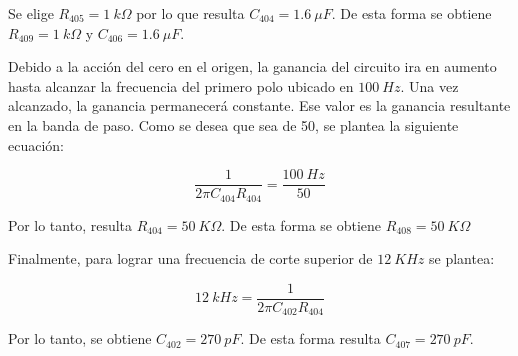 Se elige $R_{405}=1\:k\Omega$ por lo que resulta $C_{404}=1.6\:\mu F$. De esta forma se obtiene $R_{409}=1\:k\Omega$ y $C_{406}=1.6\:\mu F$.

Debido a la acción del cero en el origen, la ganancia del circuito ira en aumento hasta alcanzar la frecuencia del primero polo ubicado en $100\:Hz$. Una vez alcanzado, la ganancia permanecerá constante. Ese valor es la ganancia resultante en la banda de paso. Como se desea que sea de 50, se plantea la siguiente ecuación:

\begin{equation*} 
	\frac{1}{2\pi C_{404}R_{404}}=\frac{100\:Hz}{50}
\end{equation*}

Por lo tanto, resulta $R_{404}=50\:K\Omega$. De esta forma se obtiene $R_{408}=50\:K\Omega$

Finalmente, para lograr una frecuencia de corte superior de $12\:KHz$ se plantea:

\begin{equation*} 
	12\:kHz=\frac{1}{2\pi C_{402}R_{404}}
\end{equation*}

Por lo tanto, se obtiene $C_{402}=270\:pF$. De esta forma resulta $C_{407}=270\:pF$.



%
%
%
%
%
%
%
%
%
%
%
%


